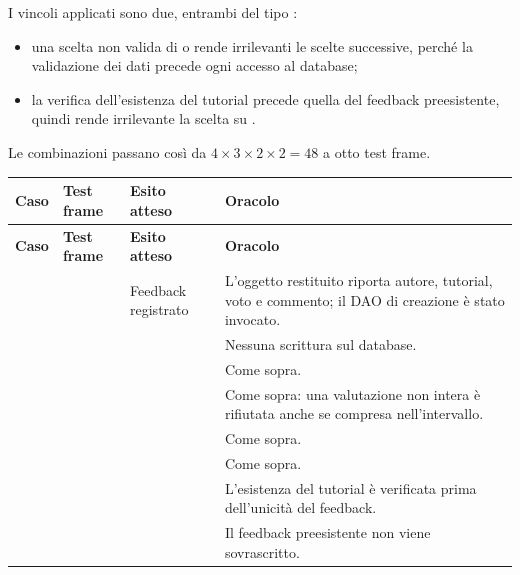 I vincoli applicati sono due, entrambi del tipo \id{[error]}:

\begin{itemize}
  \item una scelta non valida di  o  rende
    irrilevanti le scelte successive, perché la validazione dei dati precede
    ogni accesso al database;
  \item la verifica dell'esistenza del tutorial precede quella del feedback
    preesistente, quindi  rende irrilevante la scelta su .
\end{itemize}

Le combinazioni passano così da $4 \times 3 \times 2 \times 2 = 48$ a otto
test frame.

\begin{longtable}{@{}l L{4.4cm} L{3.4cm} L{4.0cm}@{}}
\toprule
\textbf{Caso} & \textbf{Test frame} & \textbf{Esito atteso} & \textbf{Oracolo} \\
\midrule
\endfirsthead
\toprule
\textbf{Caso} & \textbf{Test frame} & \textbf{Esito atteso} & \textbf{Oracolo} \\
\midrule
\endhead
\bottomrule
\endlastfoot

 &  & Feedback registrato &
  L'oggetto restituito riporta autore, tutorial, voto e commento; il DAO di
  creazione è stato invocato. \\

 &  &  &
  Nessuna scrittura sul database. \\

 &  &  &
  Come sopra. \\

 &  &  &
  Come sopra: una valutazione non intera è rifiutata anche se compresa
  nell'intervallo. \\

 &  &  &
  Come sopra. \\

 &  &  &
  Come sopra. \\

 &  &  &
  L'esistenza del tutorial è verificata prima dell'unicità del feedback. \\

 &  &  &
  Il feedback preesistente non viene sovrascritto. \\

\end{longtable}

